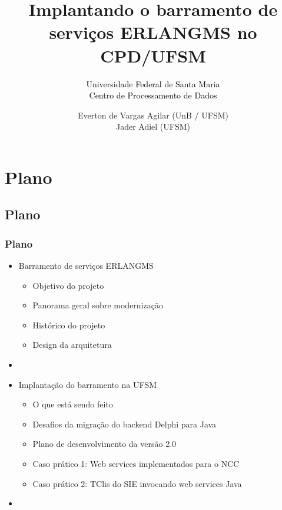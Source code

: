 \documentclass{beamer}
\title{Implantando o barramento de serviços ERLANGMS no CPD/UFSM}
\subtitle{ \textcolor{black}{Universidade Federal de Santa Maria} \\
			\textcolor{black}{\small{Centro de Processamento de Dados}} 
}
\author{Everton de Vargas Agilar (UnB / UFSM) \\
		Jader Adiel (UFSM)
}
\begin{document}
\begin{frame}
  \titlepage
\end{frame}





\section{Plano}


\subsection{Plano}

\begin{frame}
  \frametitle{Plano}

    \begin{itemize}

	    \item<1-> Barramento de serviços ERLANGMS
		    \begin{itemize}
		  	  \item<1->Objetivo do projeto
		  	  \item<1->Panorama geral sobre modernização
	    	  \item<1->Histórico do projeto
  	  	 	  \item<1->Design da arquitetura
		    \end{itemize}
	   	  \item<1-> 

	    \item<1-> Implantação do barramento na UFSM
		    \begin{itemize}
			\item<1->O que está sendo feito
			\item<1->Desafios da migração do backend Delphi para Java
			\item<1->Plano de desenvolvimento da versão 2.0
			\item<1->Caso prático 1: Web services implementados para o NCC
			\item<1->Caso prático 2: TClis do SIE invocando web services Java
		    \end{itemize}
   	    \item<1-> 
   	    


	 \end{itemize}	   	  

\end{frame}
\end{document}
